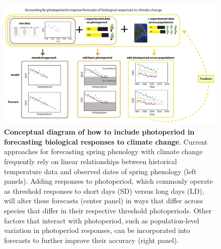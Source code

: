 \documentclass{article}
\begin{document}
\begin{figure}[p]
\includegraphics{..//..//analyses/photoperiod/figures/photocondiag6.pdf} 
\caption{\textbf{Conceptual diagram of how to include photoperiod in forecasting biological responses to climate change}. Current approaches for forecasting spring phenology with climate change frequently rely on linear relationships between historical temperature data and observed dates of spring phenology (left panels). Adding responses to photoperiod, which commonly operate as threshold responses to short days (SD) versus long days (LD), will alter these forecasts (center panel) in ways that differ across species that differ in their respective threshold photoperiods. Other factors that interact with photoperiod, such as population-level variation  in photoperiod responses, can be incorporated into forecasts to further improve their accuracy (right panel).}%
 \label{fig:condiag}
 \end{figure}
 




\end{document}
